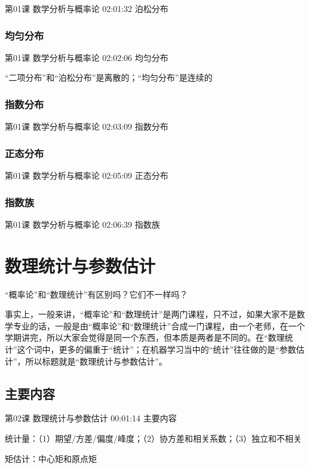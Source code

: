 \documentclass[UTF8]{ctexart}
\begin{document}
第01课 数学分析与概率论 02:01:32 泊松分布



\subsubsection{均匀分布}

第01课 数学分析与概率论 02:02:06 均匀分布

“二项分布”和“泊松分布”是离散的；“均匀分布”是连续的

\subsubsection{指数分布}

第01课 数学分析与概率论 02:03:09 指数分布

\subsubsection{正态分布}

第01课 数学分析与概率论 02:05:09 正态分布

\subsubsection{指数族}

第01课 数学分析与概率论 02:06:39 指数族

\section{数理统计与参数估计}

“概率论”和“数理统计”有区别吗？它们不一样吗？

事实上，一般来讲，“概率论”和“数理统计”是两门课程，只不过，如果大家不是数学专业的话，一般是由“概率论”和“数理统计”合成一门课程，由一个老师，在一个学期讲完，所以大家会觉得是同一个东西，但本质是两者是不同的。在“数理统计”这个词中，更多的偏重于“统计”；在机器学习当中的“统计”往往做的是“参数估计”，所以标题就是“数理统计与参数估计”。

\subsection{主要内容}

第02课 数理统计与参数估计 00:01:14 主要内容

统计量：（1）期望/方差/偏度/峰度；（2）协方差和相关系数；（3）独立和不相关

矩估计：中心矩和原点矩
\end{document}
